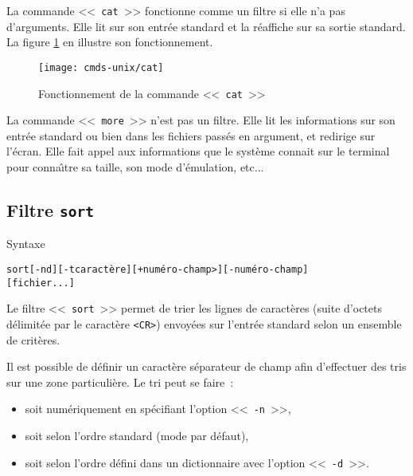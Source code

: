 La commande <<~{\tt  cat}~>> fonctionne comme un filtre si elle n'a pas
d'arguments. Elle lit sur son entr{\'e}e standard et la r{\'e}affiche sur sa
sortie standard. La figure \ref{fig-cmds-cat} en illustre son fonctionnement.

\begin{figure}[hbtp]
\centering
\texttt{[image: cmds-unix/cat]}
\caption{\label{fig-cmds-cat}Fonctionnement de la commande <<~{\tt cat}~>>}
\end{figure}

\begin{remarque}
La commande <<~{\tt more}~>> n'est pas un filtre. Elle lit les
informations sur son entr{\'e}e standard ou bien dans les fichiers pass{\'e}s en
argument, et redirige sur l'{\'e}cran. Elle fait appel aux informations que
le syst{\`e}me connait sur le terminal pour conna{\^\i}tre sa taille, son mode
d'{\'e}mulation, etc{...}
\end{remarque}

\subsection{\texorpdfstring{Filtre {\tt sort}}{Filtre sort}}

\begin{definition}{Syntaxe}
\begin{alltt}
sort [-nd] [-tcaract{\`e}re] [+num{\'e}ro-champ>] [-num{\'e}ro-champ]
            [fichier...]
\end{alltt}
\end{definition}

Le filtre <<~{\tt sort}~>> permet de trier les lignes de caract{\`e}res (suite
d'octets d{\'e}limit{\'e}e par le caract{\`e}re \verb=<CR>=) envoy{\'e}es sur l'entr{\'e}e standard
selon un ensemble de crit{\`e}res.

Il est possible de d{\'e}finir un caract{\`e}re s{\'e}parateur de champ afin
d'effectuer des tris sur une zone particuli{\`e}re. Le tri peut se faire~:
\begin{itemize}
	\item soit num{\'e}riquement en sp{\'e}cifiant l'option <<~{\tt -n}~>>,
	\item soit selon l'ordre {\ASCII} standard (mode par d{\'e}faut),
	\item soit selon l'ordre d{\'e}fini dans un dictionnaire avec l'option
		  <<~{\tt -d}~>>.
\end{itemize}

